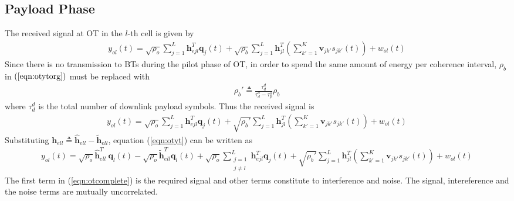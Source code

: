 \documentclass[10pt, a4paper, twoside,fleqn]{article}
\begin{document}
\subsection{Payload Phase}

The received signal at OT in the $l$-th cell is given by
\begin{eqnarray}\label{eqn:otytorg}
y_{ol}(t) = \sqrt{\rho_o} \sum_{j=1}^{L} \pmb{h}^T_{ejl} \pmb{q}_j(t)
+ \sqrt{\rho_b} \sum_{j=1}^{L} \pmb{h}^T_{jl} \left(\sum_{k'=1}^{K} \pmb{v}_{jk'} s_{jk'}(t)\right) + w_{ol}(t)  
\end{eqnarray} 
Since there is no transmission to BTs during the pilot phase of OT, in order to spend the same amount of energy per coherence interval, $\rho_b$ in $(\ref{eqn:otytorg})$ must be replaced with
\begin{eqnarray}
\rho_b' \triangleq \frac{\tau_d^d}{\tau_d^d-\tau_p^o}\rho_b
\end{eqnarray}
where $\tau_d^d$ is the total number of downlink payload symbols.
Thus the received signal is
\begin{eqnarray}\label{eqn:otyt}
 y_{ol}(t) = \sqrt{\rho_o} \sum_{j=1}^{L} \pmb{h}^T_{ejl} \pmb{q}_j(t)
            + \sqrt{\rho_b'} \sum_{j=1}^{L} \pmb{h}^T_{jl} \left(\sum_{k'=1}^{K} \pmb{v}_{jk'} s_{jk'}(t)\right) + w_{ol}(t)  
\end{eqnarray} 
Substituting $\pmb{h}_{ell} \triangleq \pmb{\hat h}_{ell}-\pmb{\widetilde{h}}_{ell}$, equation (\ref{eqn:otyt}) can be written as
\begin{eqnarray}\label{eqn:otcomplete}
  y_{ol}(t)= \sqrt{\rho_o} \pmb{\hat h}^T_{ell} \ \pmb{q}_l(t) 
	    - \sqrt{\rho_o}\pmb{\widetilde{h}}^T_{ell}\pmb{q}_l(t)
	    +\sqrt{\rho_o} \sum_{\substack{j=1 \\ j \neq l}}^{L} \pmb{h}^T_{ejl}\pmb{q}_{j}(t) 
            + \sqrt{\rho_b'} \sum_{j=1}^{L} \pmb{h}^T_{jl} \left(\sum_{k'=1}^{K} \pmb{v}_{jk'} s_{jk'}(t) \right)             
	    + w_{ol}(t)  
\end{eqnarray}
The first term in (\ref{eqn:otcomplete}) is the required signal and other terms constitute to interference and noise. The signal, intereference and the noise terms are mutually uncorrelated. 
\end{document}
